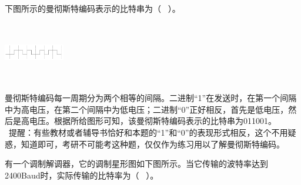 \question 下图所示的曼彻斯特编码表示的比特串为（ ~）。~

\includegraphics[width=1.04167in,height=1.04167in]{computerassets/60B84D760E1212C1E488F5431E53DC46.png}
\par{}
\begin{solution}曼彻斯特编码每一周期分为两个相等的间隔。二进制``1''在发送时，在第一个间隔中为高电压，在第二个间隔中为低电压；二进制``0''正好相反，首先是低电压，然后是高电压。根据所给图形可知，该曼彻斯特编码表示的比特串为011001。
~ ~
~提醒：有些教材或者辅导书恰好和本题的``1''和``0''的表现形式相反，这个不用疑惑，知道即可，考研不可能考这种题，仅仅作为练习用以了解曼彻斯特编码。
\end{solution}
\question 有一个调制解调器，它的调制星形图如下图所示。当它传输的波特率达到2400Baud时，实际传输的比特率为（
~）。

